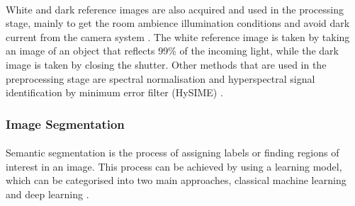 \documentclass[12pt]{article}
\begin{document}
    \paragraph{}
    White and dark reference images are also acquired and used in the processing stage, mainly to get the room ambience illumination conditions and avoid dark current from the camera system \cite{hao_fusing_2021, manni_hyperspectral_2020, seidlitz_robust_2022, fabelo_intraoperative_2018, ravi_manifold_2017}. The white reference image is taken by taking an image of an object that reflects 99\% of the incoming light, while the dark image is taken by closing the shutter. Other methods that are used in the preprocessing stage are spectral normalisation \cite{hao_fusing_2021, fabelo_helicoid_2016, seidlitz_robust_2022, yun_spectr_2021} and hyperspectral signal identification by minimum error filter (HySIME) \cite{bioucas-dias_hyperspectral_2008, hao_fusing_2021, ravi_manifold_2017}.


    \subsubsection*{Image Segmentation}
    \paragraph{}
    Semantic segmentation is the process of assigning labels or finding regions of interest in an image. This process can be achieved by using a learning model, which can be categorised into two main approaches, classical machine learning and deep learning \cite{wu_review_2022}.
    
\end{document}
